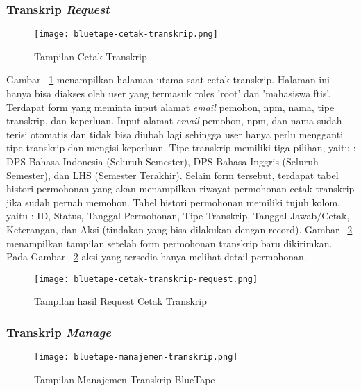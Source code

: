 	\subsubsection{Transkrip \textit{Request}} 
	\begin{figure}[H]
		\centering  
		\texttt{[image: bluetape-cetak-transkrip.png]}  
		\caption[Tampilan Cetak Transkrip]{Tampilan Cetak Transkrip} 
		\label{fig:bluetape-cetak-transkrip} 
	\end{figure}
	
	Gambar~ \ref{fig:bluetape-cetak-transkrip} menampilkan halaman utama saat cetak transkrip. Halaman ini hanya bisa diakses oleh user yang termasuk roles 'root' dan 'mahasiswa.ftis'. Terdapat form yang meminta input alamat \textit{email} pemohon, npm, nama, tipe transkrip, dan keperluan. Input alamat \textit{email} pemohon, npm, dan nama sudah terisi otomatis dan tidak bisa diubah lagi sehingga user hanya perlu mengganti tipe transkrip dan mengisi keperluan. Tipe transkrip memiliki tiga pilihan, yaitu : DPS Bahasa Indonesia (Seluruh Semester), DPS Bahasa Inggris (Seluruh Semester), dan LHS (Semester Terakhir). Selain form tersebut, terdapat tabel histori permohonan yang akan menampilkan riwayat permohonan cetak transkrip jika sudah pernah memohon. Tabel histori permohonan memiliki tujuh kolom, yaitu : ID, Status, Tanggal Permohonan, Tipe Transkrip, Tanggal Jawab/Cetak, Keterangan, dan Aksi (tindakan yang bisa dilakukan dengan record). Gambar~ \ref{fig:bluetape-cetak-transkrip-request} menampilkan tampilan setelah form permohonan transkrip baru dikirimkan. Pada Gambar~ \ref{fig:bluetape-cetak-transkrip-request} aksi yang tersedia hanya melihat detail permohonan.

	\begin{figure}[H]
		\centering  
		\texttt{[image: bluetape-cetak-transkrip-request.png]}  
		\caption[Tampilan hasil Request Cetak Transkrip]{Tampilan hasil Request Cetak Transkrip} 
		\label{fig:bluetape-cetak-transkrip-request} 
	\end{figure}
	
	\subsubsection{Transkrip \textit{Manage}}
	\begin{figure}[H]
		\centering  
		\texttt{[image: bluetape-manajemen-transkrip.png]}  
		\caption[Tampilan Manajemen Transkrip BlueTape]{Tampilan Manajemen Transkrip BlueTape} 
		\label{fig:bluetape-manajemen-transkrip} 
	\end{figure}
	
